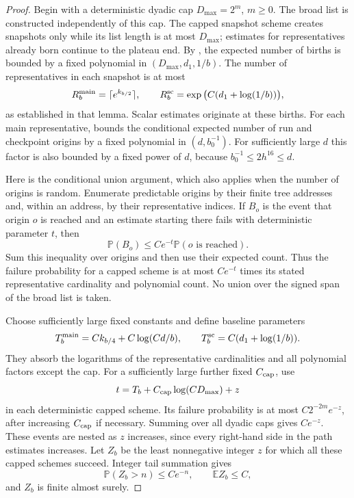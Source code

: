 \begin{proof}
Begin with a deterministic dyadic cap $D_{\max}=2^m$, $m\ge0$.
The broad list is constructed independently of this cap.  The capped
snapshot scheme creates snapshots only while its list length is at most
$D_{\max}$; estimates for representatives already born continue to the
plateau end.  By , the expected number of births
is bounded by a fixed polynomial in $(D_{\max},d_1,1/b)$.  The number of
representatives in each snapshot is at most
\[
 R_b^{\rm main}=\lceil e^{k_{b/2}}\rceil,
 \qquad R_b^{\rm sc}=\exp\big(C(d_1+\log(1/b))\big),
\]
as established in that lemma.  Scalar estimates originate at these
births.  For each main representative,  bounds
the conditional expected number of run and checkpoint origins by a
fixed polynomial in $(d,b_0^{-1})$.  For sufficiently large $d$ this
factor is also bounded by a fixed power of $d$, because
$b_0^{-1}\le2h^{16}\le d$.

Here is the conditional union argument, which also applies when the
number of origins is random.  Enumerate predictable origins by their
finite tree addresses and, within an address, by their representative
indices.  If $B_o$ is the event that origin $o$ is reached and an estimate
starting there fails with deterministic parameter $t$, then
\[
 \mathbb P(B_o)
 \le Ce^{-t}\mathbb P(o\text{ is reached}).
\]
Sum this inequality over origins and then use their expected count.
Thus the failure probability for a capped scheme is at most $Ce^{-t}$
times its stated representative cardinality and polynomial count.  No
union over the signed span of the broad list is taken.

Choose sufficiently large fixed constants and define baseline parameters
\[
 T_b^{\rm main}=Ck_{b/4}+C\log(Cd/b),\qquad
 T_b^{\rm sc}=C(d_1+\log(1/b)).
\]
They absorb the logarithms of the representative cardinalities and all
polynomial factors except the cap.  For a sufficiently large further
fixed $C_{\rm cap}$, use
\[
 t=T_b+C_{\rm cap}\log(CD_{\max})+z
\]
in each deterministic capped scheme.  Its failure probability is at most
$C2^{-2m}e^{-z}$, after increasing $C_{\rm cap}$ if necessary.  Summing
over all dyadic caps gives $Ce^{-z}$.  These events are nested as $z$
increases, since every right-hand side in the path estimates increases.
Let $Z_b$ be the least nonnegative integer $z$ for which all these capped
schemes succeed.  Integer tail summation gives
\[
 \mathbb P(Z_b>n)\le Ce^{-n},\qquad \mathbb E Z_b\le C,
\]
and $Z_b$ is finite almost surely.


\end{proof}
